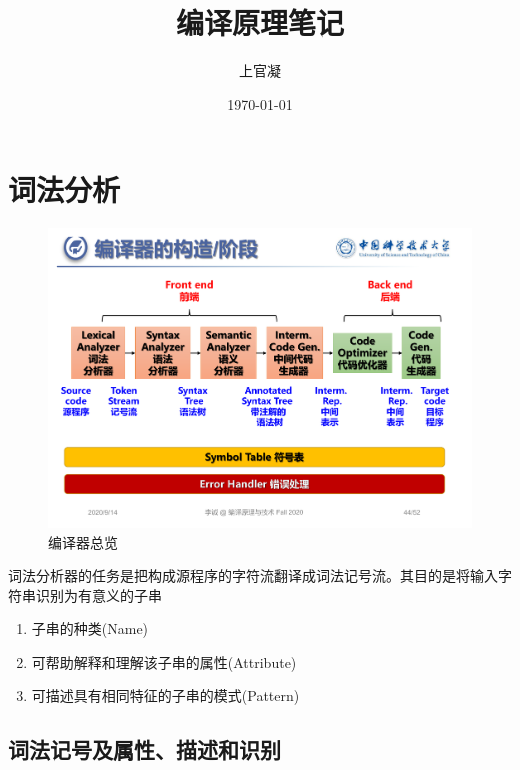 \documentclass[]{report}
\title{{\huge {编译原理笔记}}}
\author{上官凝}
\date{\today}
\begin{document}
\theoremstyle{definition} \newtheorem{theorem}{Thm}[section] %
\theoremstyle{definition} \newtheorem{definition}{Def}[section] %
\theoremstyle{plain} \newtheorem{lemma}{lemma}[section] %

	\maketitle
	\newpage

	\tableofcontents
	\newpage

	\chapter{词法分析}
	\begin{figure}
		\centering
		\begin{minipage}{40em}
			\centering
			\includegraphics[scale = 0.3]{images/lecture_intro.pdf}
			\caption{编译器总览}
		\end{minipage}
	\end{figure}
	词法分析器的任务是把构成源程序的字符流翻译成词法记号流。其目的是将输入字符串识别为有意义的子串
	\begin{enumerate}
		\item 子串的种类(Name)
		\item 可帮助解释和理解该子串的属性(Attribute)
		\item 可描述具有相同特征的子串的模式(Pattern)
	\end{enumerate}
	\section{词法记号及属性、描述和识别}
\end{document}
